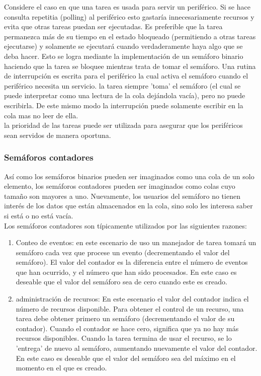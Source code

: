 Considere el caso en que una tarea es usada para servir un periférico. Si se hace consulta repetitia (polling) al periférico esto gastaría innecesariamente recursos y evita que otras tareas puedan ser ejecutadas. Es preferible que la tarea permanezca más de su tiempo en el estado bloqueado (permitiendo a otras tareas ejecutarse) y solamente se ejecutará cuando verdaderamente haya algo que se deba hacer. Esto se logra mediante la implementación de un semáforo binario haciendo que la tarea se bloquee mientras trata de tomar el semáforo. Una rutina de interrupción es escrita para el periférico la cual activa el semáforo cuando el periférico necesita un servicio. la tarea siempre 'toma' el semáforo (el cual se puede interpretar como una lectura de la cola dejándola vacía), pero no puede escribirla. De este mismo modo la interrupción puede solamente escribir en la cola mas no leer de ella. \\

la prioridad de las tareas puede ser utilizada para asegurar que los periféricos sean servidos de manera oportuna.

\subsubsection{Semáforos contadores}

Así como los semáforos binarios pueden ser imaginados como una cola de un solo elemento, los semáforos contadores pueden ser imaginados como colas cuyo tamaño son mayores a uno. Nuevamente, los usuarios del semáforo no tienen interés de los datos que están almacenados en la cola, sino solo les interesa saber si está o no está vacía.\\

Los semáforos contadores son típicamente utilizados por las siguientes razones: \\

\begin{enumerate}
    \item Conteo de eventos: en este escenario de uso un manejador de tarea tomará un semáforo cada vez que procese un evento (decrementando el valor del semáforo). El valor del contador es la diferencia entre el número de eventos que han ocurrido, y el número que han sido procesados. En este caso es deseable que el valor del semáforo sea de cero cuando este es creado.
    \item administración de recursos: En este escenario el valor del contador indica el número de recursos disponible. Para obtener el control de un recurso, una tarea debe obtener primero un semáforo (decrementando el valor de su contador). Cuando el contador se hace cero, significa que ya no hay más recursos disponibles. Cuando la tarea termina de usar el recurso, se lo 'entrega' de nuevo al semáforo, aumentando nuevamente el valor del contador. En este caso es deseable que el valor del semáforo sea del máximo en el momento en el que es creado.
\end{enumerate}

